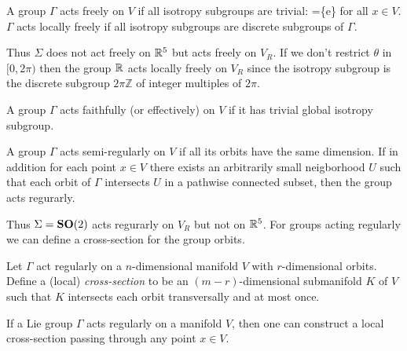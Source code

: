 \begin{definition}
\label{def:free}
A group $\Gamma$ acts freely on $V$ if all isotropy subgroups are trivial: =\{e\} for all $x\in V$.
$\Gamma$ acts locally freely if all isotropy subgroups are discrete subgroups of $\Gamma$.
\end{definition}

Thus $\Sigma$ does not act freely on $\mathbb{R}^{5}$ but acts freely on $V_R$. If we don't
restrict $\theta$ in $[0,2\pi)$ then the group $\mathbb{R}^{}$ acts locally freely on $V_R$
since the isotropy subgroup is the discrete subgroup $2\pi\mathbb{Z}$ of integer multiples of $2\pi$.

\begin{definition}
\label{def:faithfull}
A group $\Gamma$ acts faithfully (or effectively) on $V$ if it has trivial global isotropy subgroup.
\end{definition}

\begin{definition}
\label{def:regular}
A group $\Gamma$ acts semi-regularly on $V$ if all its orbits have the same dimension. If in addition for each point $x\in V$
there exists an arbitrarily small neigborhood $U$ such that each orbit of $\Gamma$ intersects $U$ in a pathwise connected subset, then the group
acts regurarly.
\end{definition}

Thus $\Sigma=\mathbf{SO}(2)$ acts regurarly on $V_R$ but not on $\mathbb{R}^{5}$. For groups acting regularly we can define a cross-section for the group orbits.

\begin{definition}
\label{def:cross-section}
Let $\Gamma$ act regularly on a $n$-dimensional manifold $V$ with $r$-dimensional orbits. Define a (local) \emph{cross-section}
to be an $(m-r)$-dimensional submanifold $K$ of $V$ such that $K$ intersects each orbit transversally and at most once.
\end{definition}

\begin{proposition}
 If a Lie group $\Gamma$ acts regularly on a manifold $V$, then one can construct a local cross-section
 passing through any point $x\in V$.
\end{proposition}

